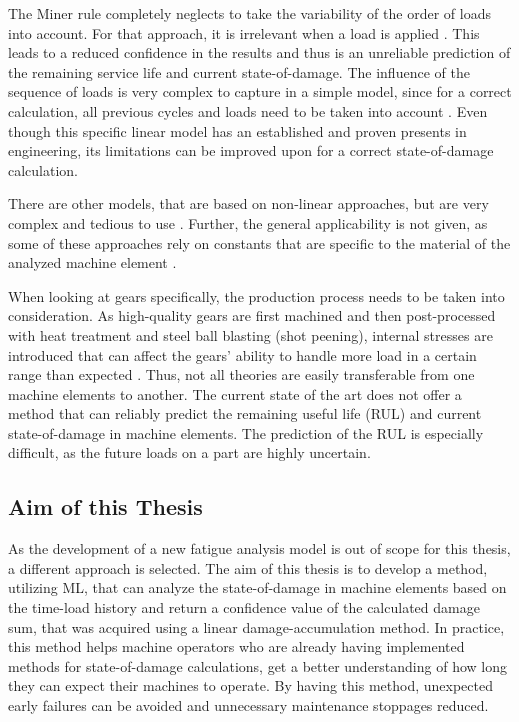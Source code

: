 The Miner rule completely neglects to take the variability of the order of loads into account. For that approach, it is irrelevant when a load is applied \cite{ISO1}. 
This leads to a reduced confidence in the results and thus is an unreliable prediction of the remaining service life and current state-of-damage.
The influence of the sequence of loads is very complex to capture in a simple model, since for a correct calculation, all previous cycles and loads need to be taken into account \cite{Vietze}. Even though this specific linear model has an established and proven presents in engineering, its limitations can be improved upon for a correct state-of-damage calculation.

There are other models, that are based on non-linear approaches, but are very complex and tedious to use \cite{Vietze}. Further, the general applicability is not given, as some of these approaches rely on constants that are specific to the material of the analyzed machine element \cite{Sander}.

When looking at gears specifically, the production process needs to be taken into consideration. As high-quality gears are first machined and then post-processed with heat treatment and steel ball blasting (shot peening), internal stresses are introduced that can affect the gears' ability to handle more load in a certain range than expected \cite{Benedetti}. %
Thus, not all theories are easily transferable from one machine elements to another. The current state of the art does not offer a method that can reliably predict the remaining useful life (RUL) and current state-of-damage in machine elements. The prediction of the RUL is especially difficult, as the future loads on a part are highly uncertain.


\subsection{Aim of this Thesis}
As the development of a new fatigue analysis model is out of scope for this thesis, a different approach is selected.
The aim of this thesis is to develop a method, utilizing ML, that can analyze the state-of-damage in machine elements based on the time-load history and return a confidence value of the calculated damage sum, that was acquired using a linear damage-accumulation method.
In practice, this method helps machine operators who are already having implemented methods for state-of-damage calculations, get a better understanding of how long they can expect their machines to operate. By having this method, unexpected early failures can be avoided and unnecessary maintenance stoppages reduced. 

